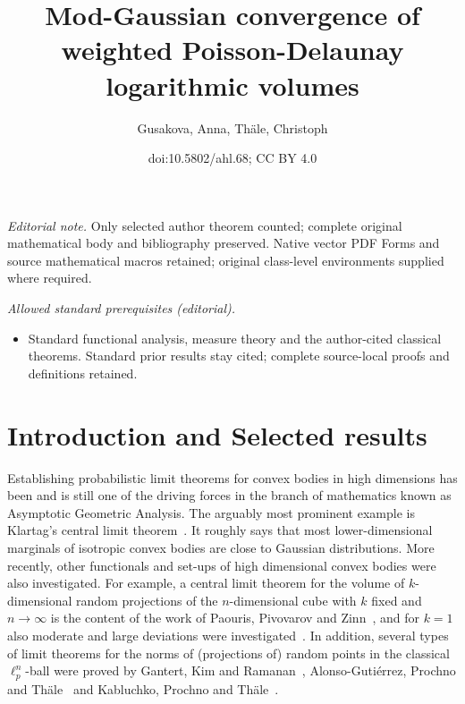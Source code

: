 \documentclass[10pt]{amsart}
\title{Mod-Gaussian convergence of weighted Poisson-Delaunay logarithmic volumes}
\author{Gusakova, Anna, Thäle, Christoph}
\date{doi:10.5802/ahl.68; CC BY 4.0}
\theoremstyle{definition}\newtheorem{defi}[theo]{Definition}\newtheorem{rema}[theo]{Remark}\newtheorem{exam}[theo]{Example}\newtheorem{exem}[theo]{Example}\newtheorem{nota}[theo]{Notation}
\begin{document}
\maketitle
\noindent\textit{Editorial note.} Only selected author theorem counted; complete original mathematical body and bibliography preserved. Native vector PDF Forms and source mathematical macros retained; original class-level environments supplied where required.\par\medskip
\noindent\textit{Allowed standard prerequisites (editorial).}\begin{itemize}
\item Standard functional analysis, measure theory and the author-cited classical theorems. Standard prior results stay cited; complete source-local proofs and definitions retained.
\end{itemize}\medskip

\section{Introduction and Selected results}

Establishing probabilistic limit theorems for convex bodies in high dimensions has been and is still one of the driving forces in the branch of mathematics known as Asymptotic Geometric Analysis. The arguably most prominent example is Klartag's central limit theorem~\cite{KlartagCLT}. It roughly says that most lower-dimensional marginals of isotropic convex bodies are close to Gaussian distributions. More recently, other functionals and set-ups of high dimensional convex bodies were also investigated. For example, a central limit theorem for the volume of $k$-dimensional random projections of the $n$-dimensional cube with $k$ fixed and $n\to\infty$ is the content of the work of Paouris, Pivovarov and Zinn~\cite{PPZ}, and for $k=1$ also moderate and large deviations were investigated~\cite{KPT19a,KPT19b}. In addition, several types of limit theorems for the norms of (projections of) random points in the classical $\ell_p^n$-ball were proved by Gantert, Kim and Ramanan~\cite{GKR}, Alonso-Gutiérrez, Prochno and Th\"ale~\cite{APT18,APT17} and Kabluchko, Prochno and Th\"ale~\cite{KPT19a,KPT19b}.
\end{document}
